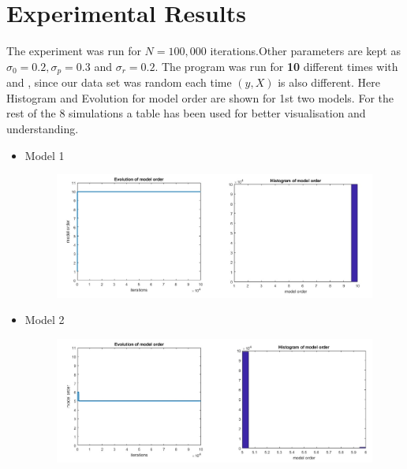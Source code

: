 \documentclass[12pt,a4paper]{article}
\begin{document}
\section{Experimental Results}
The experiment was run for $N=100,000$ iterations.Other parameters are kept as $\sigma_0=0.2,\sigma_p=0.3$ and $\sigma_r=0.2$. The program was run for \textbf{10} different times with and , since our data set was random each time $(y,X)$ is also different. Here Histogram and Evolution for model order are shown for 1st two models. For the rest of the 8 simulations a table has been used for better visualisation and understanding.
\begin{itemize}
    \item Model 1
    \begin{figure}[htp]
\centering
    \includegraphics[width=\textwidth,height=\textheight,keepaspectratio]{Run 1 Final.jpg}
\end{figure}
\newpage
    \item Model 2
    \begin{figure}[htp]
\centering
    \includegraphics[width=\textwidth,height=\textheight,keepaspectratio]{Run 2 Final.jpg}
\end{figure}
\end{itemize}
\end{document}
